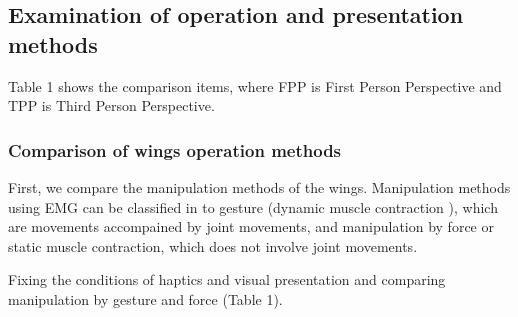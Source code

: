 \documentclass[letterpaper, 10 pt, conference]{ieeeconf}  %
\begin{document}
        \subsection{Examination of operation and presentation methods}
                \begin{table}[tb]
                        \begin{center}
                        \caption{Comparison items}
                        \end{center}
                \end{table}

                Table 1 shows the comparison items, where FPP is First Person Perspective and TPP is Third Person Perspective.  

                \subsubsection{Comparison of wings operation methods}
                        First, we compare the manipulation methods of the wings.  
                        Manipulation methods using EMG can be classified in to gesture (dynamic muscle contraction\cite{thistle1967isokinetic} ), which are movements accompained by joint movements, and manipulation by force or static muscle contraction, which does not involve joint movements.  
                        
                        Fixing the conditions of haptics and visual presentation and comparing manipulation by gesture and force (Table 1).

                
\end{document}

